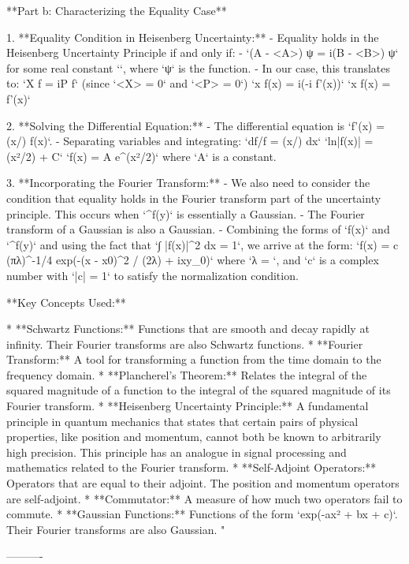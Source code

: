**Part b: Characterizing the Equality Case**

1. **Equality Condition in Heisenberg Uncertainty:**
   - Equality holds in the Heisenberg Uncertainty Principle if and only if:
     -  `(A - <A>) ψ = i\alpha (B - <B>) ψ` for some real constant `\alpha`, where `ψ` is the function.
   - In our case, this translates to:
     `X f = i\alpha P f` (since `<X> = 0` and `<P> = 0`)
     `x f(x) = i\alpha (-i f'(x))`
     `x f(x) = \alpha f'(x)`

2. **Solving the Differential Equation:**
   - The differential equation is `f'(x) = (x/\alpha) f(x)`.
   - Separating variables and integrating:
     `df/f = (x/\alpha) dx`
     `ln|f(x)| = (x²/2\alpha) + C`
     `f(x) = A e^(x²/2\alpha)` where `A` is a constant.

3. **Incorporating the Fourier Transform:**
   - We also need to consider the condition that equality holds in the Fourier transform part of the uncertainty principle. This occurs when `^f(y)` is essentially a Gaussian.
   - The Fourier transform of a Gaussian is also a Gaussian.
   - Combining the forms of `f(x)` and `^f(y)` and using the fact that `∫ |f(x)|^2 dx = 1`, we arrive at the form:
     `f(x) = c (πλ)^{-1/4} exp(-(x - x0)^2 / (2λ) + ixy_0)`
     where `λ = \alpha`, and `c` is a complex number with `|c| = 1` to satisfy the normalization condition.

**Key Concepts Used:**

* **Schwartz Functions:** Functions that are smooth and decay rapidly at infinity. Their Fourier transforms are also Schwartz functions.
* **Fourier Transform:** A tool for transforming a function from the time domain to the frequency domain.
* **Plancherel's Theorem:** Relates the integral of the squared magnitude of a function to the integral of the squared magnitude of its Fourier transform.
* **Heisenberg Uncertainty Principle:** A fundamental principle in quantum mechanics that states that certain pairs of physical properties, like position and momentum, cannot both be known to arbitrarily high precision. This principle has an analogue in signal processing and mathematics related to the Fourier transform.
* **Self-Adjoint Operators:** Operators that are equal to their adjoint. The position and momentum operators are self-adjoint.
* **Commutator:** A measure of how much two operators fail to commute.
* **Gaussian Functions:** Functions of the form `exp(-ax² + bx + c)`. Their Fourier transforms are also Gaussian.
"

----------

